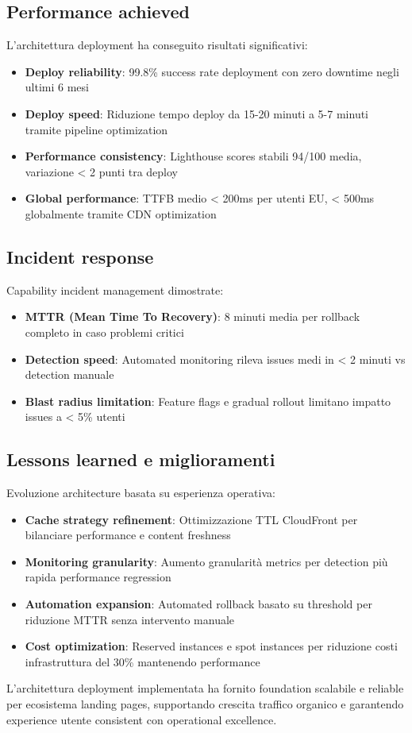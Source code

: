 \subsection{Performance achieved}
L'architettura deployment ha conseguito risultati significativi:
\begin{itemize}
  \item \textbf{Deploy reliability}: 99.8\% success rate deployment con zero 
  downtime negli ultimi 6 mesi
  \item \textbf{Deploy speed}: Riduzione tempo deploy da 15-20 minuti a 5-7 
  minuti tramite pipeline optimization
  \item \textbf{Performance consistency}: Lighthouse scores stabili 94/100 
  media, variazione < 2 punti tra deploy
  \item \textbf{Global performance}: TTFB medio < 200ms per utenti EU, < 500ms 
  globalmente tramite CDN optimization
\end{itemize}

\subsection{Incident response}
Capability incident management dimostrate:
\begin{itemize}
  \item \textbf{MTTR (Mean Time To Recovery)}: 8 minuti media per rollback 
  completo in caso problemi critici
  \item \textbf{Detection speed}: Automated monitoring rileva issues medi 
  in < 2 minuti vs detection manuale
  \item \textbf{Blast radius limitation}: Feature flags e gradual rollout 
  limitano impatto issues a < 5\% utenti
\end{itemize}

\subsection{Lessons learned e miglioramenti}
Evoluzione architecture basata su esperienza operativa:
\begin{itemize}
  \item \textbf{Cache strategy refinement}: Ottimizzazione TTL CloudFront 
  per bilanciare performance e content freshness
  \item \textbf{Monitoring granularity}: Aumento granularità metrics per 
  detection più rapida performance regression
  \item \textbf{Automation expansion}: Automated rollback basato su threshold 
  per riduzione MTTR senza intervento manuale
  \item \textbf{Cost optimization}: Reserved instances e spot instances per 
  riduzione costi infrastruttura del 30\% mantenendo performance
\end{itemize}

\bigskip
L'architettura deployment implementata ha fornito foundation scalabile e 
reliable per ecosistema landing pages, supportando crescita traffico organico 
e garantendo experience utente consistent con operational excellence.